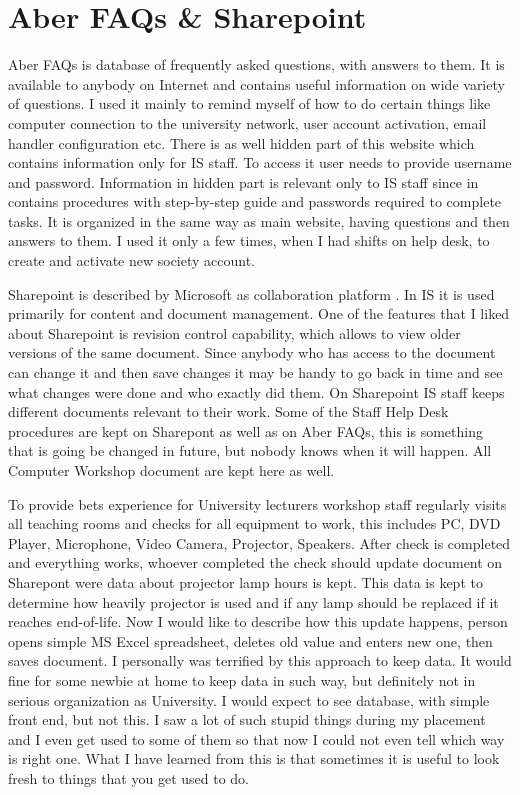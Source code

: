 \documentclass[10pt,a4paper,headinclude=true]{report}
\begin{document}
\section{Aber FAQs \& Sharepoint}
\label{sec:faqs}
Aber FAQs is database of frequently asked questions, with answers to them. It is available to anybody on Internet and contains useful information on wide variety of questions. I used it mainly to remind myself of how to do certain things like computer connection to the university network, user account activation, email handler configuration etc. There is as well hidden part of this website which contains information only for IS staff. To access it user needs to provide username and password. Information in hidden part is relevant only to IS staff since in contains procedures with step-by-step guide and passwords required to complete tasks. It is organized in the same way as main website, having questions and then answers to them. I used it only a few times, when I had shifts on help desk, to create and activate new society account.

Sharepoint is described by Microsoft as collaboration platform \cite{Sharepoint}. In IS it is used primarily for content and document management. One of the features that I liked about Sharepoint is revision control capability, which allows to view older versions of the same document. Since anybody who has access to the document can change it and then save changes it may be handy to go back in time and see what changes were done and who exactly did them. On Sharepoint IS staff keeps different documents relevant to their work. Some of the Staff Help Desk procedures are kept on Sharepont as well as on Aber FAQs, this is something that is going be changed in future, but nobody knows when it will happen. All Computer Workshop document are kept here as well. 

To provide bets experience for University lecturers workshop staff regularly visits all teaching rooms and checks for all equipment to work, this includes PC, DVD Player, Microphone, Video Camera, Projector, Speakers. After check is completed and everything works, whoever completed the check should update document on Sharepont were data about projector lamp hours is kept. This data is kept to determine how heavily projector is used and if any lamp should be replaced if it reaches end-of-life. Now I would like to describe how this update happens, person opens simple MS Excel spreadsheet, deletes old value and enters new one, then saves document. I personally was terrified by this approach to keep data. It would fine for some newbie at home to keep data in such way, but definitely not in serious organization as University. I would expect to see database, with simple front end, but not this. I saw a lot of such stupid things during my placement and I even get used to some of them so that now I could not even tell which way is right one. What I have learned from this is that sometimes it is useful to look fresh to things that you get used to do.      
\end{document}
